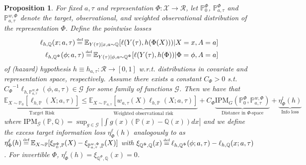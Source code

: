 \documentclass{article}
\newtheorem{proposition}{Proposition}
\newcommand{\IPM}{\text{IPM}}
\newcommand\defeq{\mathrel{\stackrel{\makebox[0pt]{\mbox{\normalfont\tiny def}}}{=}}}
\begin{document}
\begin{proposition} For fixed $a, \tau$ and representation $\Phi: \mathcal{X} \rightarrow \mathcal{R}$, let $\mathbb{P}_0^{\Phi}$, $\mathbb{P}^{\Phi}_{a, \tau}$ and $\mathbb{P}^{w, \Phi}_{a, \tau}$ denote the target, observational, and weighted observational distribution of the representation $\Phi$. Define the pointwise losses
\begin{equation}
\begin{split}
    \ell_{h, \mathbb{Q}}(x; a, \tau) \defeq \mathbb{E}_{Y(\tau)|x, a \sim \mathbb{Q}}[\ell(Y(\tau), h(\Phi(X)))|X=x, A=a] \\
    \ell_{h, \mathbb{Q}^\Phi}(\phi; a, \tau) \defeq \mathbb{E}_{Y(\tau)|\phi, a \sim \mathbb{Q}^\Phi}[\ell(Y(\tau), h(\Phi))|\Phi=\phi, A=a]
\end{split}
\end{equation}
of (hazard) hypothesis $h \equiv h_{a, \tau}: \mathcal{R} \rightarrow [0,1]$ w.r.t. distributions in covariate and representation space, respectively. Assume there exists a constant $C_\Phi>0$ s.t. ${C_\Phi}^{-1} \ell_{h,\mathbb{P}^{w, \Phi}_{a, \tau}}(\phi, a, \tau)
 \in \mathcal{G}$ for some family of functions $\mathcal{G}$. Then we have that 
\begin{equation}\label{eq:mainbound}
   \underbrace{\mathbb{E}_{X \sim \mathbb{P}_0}[\ell_{h, \mathbb{P}}(X; a, \tau)]}_{\text{Target Risk}} \leq  \underbrace{\mathbb{E}_{X \sim \mathbb{P}_{a, \tau}}[w_{a, \tau}(X)\ell_{h, \mathbb{P}}(X; a, \tau)]}_{\text{Weighted observational risk}} + C_\Phi \underbrace{\IPM_G(\mathbb{P}_0^{\Phi}, \mathbb{P}^{w, \Phi}_{a, \tau})}_{\text{Distance in } \Phi \text{-space}} + \underbrace{\eta^l_\Phi(h)}_{\text{Info loss}}
\end{equation}
where $\IPM_\mathcal{G}(\mathbb{P}, \mathbb{Q}) = \sup_{g\in \mathcal{G}}\left|\int g(x) (\mathbb{P}(x) - \mathbb{Q}(x))dx\right| $ and we define the excess target information loss $\eta^{\ell}_\Phi(h)$ analogously to \cite{johansson2019support} as 
    $\eta^{\ell}_\Phi(h) \defeq \mathbb{E}_{X\sim \mathbb{P}}[\xi_{\mathbb{P}_0^\Phi, \mathbb{P}}(X) - \xi_{\mathbb{P}^{w, \Phi}_{a, \tau}, \mathbb{P}}(X)]$  with $\xi_{ \mathbb{Q}^\Phi, \mathbb{Q}}(x) \defeq  \ell_{h, \mathbb{Q}^\Phi}(\phi; a, \tau) - \ell_{h, \mathbb{Q}}(x; a, \tau)$. For invertible $\Phi$, $\eta^{\ell}_\Phi(h)=\xi_{\mathbb{Q}^\Phi, \mathbb{Q}}(x)=0$.
\end{proposition} 
\end{document}
